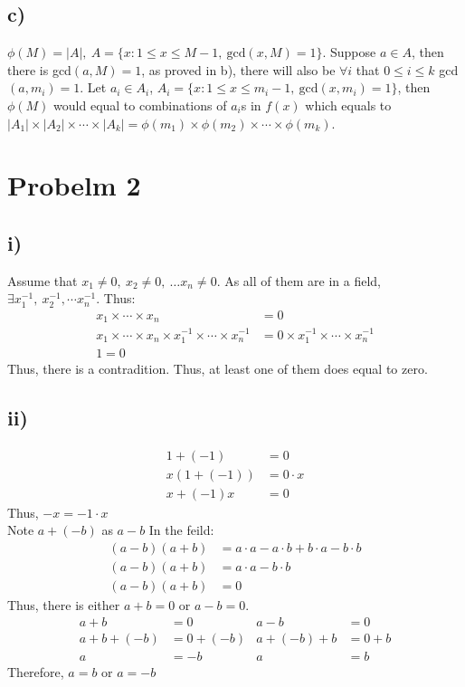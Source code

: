 \documentclass{article}
\begin{document}
\subsection*{c)}
\(\phi(M)=|A|,\ A = \{x:1\leqslant x\leqslant M-1,\ \text{gcd}(x,M)=1\}\). Suppose \(a\in A\), then there is
gcd\((a,M)=1\), as proved in b), there will also be \(\forall i\) that \(0\leqslant i \leqslant k\) gcd\((a,m_i)=1\).
Let \(a_i\in A_i\), \(A_i = \{x:1\leqslant x\leqslant m_i-1,\ \text{gcd}(x,m_i)=1\}\), then \(\phi(M)\) would equal to combinations of \(a_i\)s in \(f(x)\) which
equals to \(|A_1|\times |A_2|\times \cdots \times |A_k|=\phi(m_1)\times \phi(m_2)\times \cdots \times \phi(m_k)\).
\section*{Probelm 2}


\subsection*{i)}
Assume that \(x_1\neq 0,\ x_2\neq0,\ \dots x_n\neq0\). As all of them are in a field, 
\(\exists x_1^{-1},\ x_2^{-1},\cdots x_n^{-1}\). Thus:
\begin{align*}
    x_1\times \cdots \times x_n&=0\\
    x_1\times \cdots \times x_n\times x^{-1}_1\times \cdots \times x_n^{-1}&=0\times x^{-1}_1\times \cdots \times x_n^{-1}\\
    1=0
\end{align*}
Thus, there is a contradition. Thus, at least one of them does equal to zero.
\subsection*{ii)}
\begin{align*}
    1+(-1)&=0\\
    x(1+(-1))&=0\cdot x\\
    x+(-1)x &= 0
\end{align*}
Thus, \(-x = -1\cdot x\)\\
Note \(a+(-b)\) as \(a-b\)
In the feild:
\begin{align*}
    (a-b)(a+b)&=a\cdot a-a\cdot b +b\cdot a -b\cdot b\\
    (a-b)(a+b)&=a\cdot a - b\cdot b\\
    (a-b)(a+b)&=0
\end{align*}
Thus, there is either \(a+b=0\) or \(a-b = 0\).
\begin{align*}
    a+b&=0&a-b &= 0\\
    a+b+(-b)&=0+(-b)&a+(-b)+b&=0+b\\
    a&=-b&a&=b
\end{align*}
Therefore, \(a=b\) or \(a=-b\)
\end{document}
